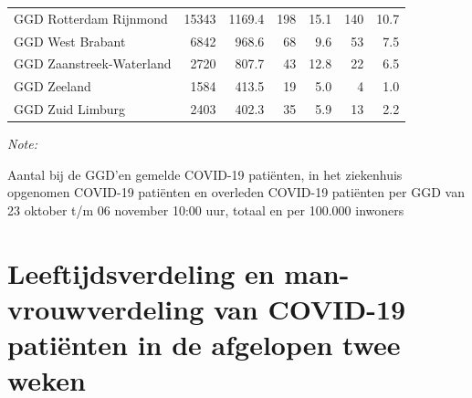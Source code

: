 \documentclass[
  english,
  man,floatsintext]{apa6}
\begin{document}
\begin{table}[H]
\begin{threeparttable}
\begin{tabular}{lrrrrrr}
GGD Rotterdam Rijnmond & 15343 & 1169.4 & 198 & 15.1 & 140 & 10.7\\
GGD West Brabant & 6842 & 968.6 & 68 & 9.6 & 53 & 7.5\\
GGD Zaanstreek-Waterland & 2720 & 807.7 & 43 & 12.8 & 22 & 6.5\\
GGD Zeeland & 1584 & 413.5 & 19 & 5.0 & 4 & 1.0\\
GGD Zuid Limburg & 2403 & 402.3 & 35 & 5.9 & 13 & 2.2\\
\bottomrule
\end{tabular}
\begin{tablenotes}
\item \textit{Note: } 
\item Aantal bij de GGD’en gemelde COVID-19 patiënten, in het ziekenhuis opgenomen COVID-19 patiënten en overleden COVID-19 patiënten per GGD van 23 oktober t/m 06 november 10:00 uur, totaal en per 100.000 inwoners
\end{tablenotes}
\end{threeparttable}
\endgroup{}
\end{table}

\newpage

\hypertarget{leeftijdsverdeling-en-man-vrouwverdeling-van-covid-19-patiuxebnten-in-de-afgelopen-twee-weken}{%
\section{Leeftijdsverdeling en man-vrouwverdeling van COVID-19 patiënten in de afgelopen twee weken}\label{leeftijdsverdeling-en-man-vrouwverdeling-van-covid-19-patiuxebnten-in-de-afgelopen-twee-weken}}
\end{document}
